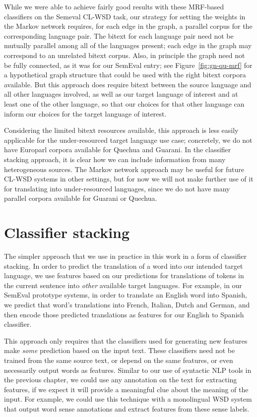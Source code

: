 While we were able to achieve fairly good results with these MRF-based
classifiers on the Semeval CL-WSD task, our strategy for setting the weights in
the Markov network requires, for each edge in the graph, a parallel corpus for
the corresponding language pair. The bitext for each language pair need not be
mutually parallel among all of the languages present; each edge in the graph
may correspond to an unrelated bitext corpus.  Also, in principle the graph
need not be fully connected, as it was for our SemEval entry; see
Figure~\ref{fig:gn-qu-mrf} for a hypothetical graph structure that could be
used with the right bitext corpora available. But this approach
does require bitext between the source language and all other languages
involved, as well as our target language of interest and at least one of the
other language, so that our choices for that other language can inform our
choices for the target language of interest.

Considering the limited bitext resources available, this approach is less
easily applicable for the under-resourced target language use case; concretely,
we do not have Europarl corpora available for Quechua and Guarani. In the
classifier stacking approach, it is clear how we can include information from
many heterogeneous sources. The Markov network approach may be useful for
future CL-WSD systems in other settings, but for now we will not make further
use of it for translating into under-resourced languages, since we do not have
many parallel corpora available for Guarani or Quechua.

\section{Classifier stacking}

The simpler approach that we use in practice in this work in a form of
classifier stacking. In order to predict the translation of a word into our
intended target language, we use features based on our predictions for
translations of tokens in the current sentence into \emph{other} available
target languages.
For example, in our SemEval prototype systems, in order to translate an
English word into Spanish, we predict that word's translations into French,
Italian, Dutch and German, and then encode those predicted translations as
features for our English to Spanish classifier.

This approach only requires that the classifiers used for generating new
features make \emph{some} prediction based on the input text. These classifiers 
need not be trained from the same source text, or depend on the same features,
or even necessarily output words as features. Similar to our use of syntactic
NLP tools in the previous chapter, we could use any annotation on the text for
extracting features, if we expect it will provide a meaningful clue about the
meaning of the input. For example, we could use this technique with a
monolingual WSD system that output word sense annotations and extract features
from these sense labels.

